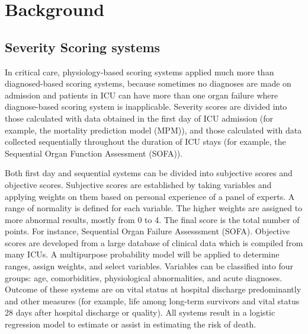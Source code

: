 \documentclass[12pt,a4paper,english
]{tunithesis}
\begin{document}
\chapter{Background}
\label{ch:background}


\section{Severity Scoring systems}
In critical care, physiology-based scoring systems applied much more than diagnosed-based scoring systems, because sometimes no diagnoses are made on admission and patients in ICU can have more than one organ failure where diagnose-based scoring system is inapplicable. \parencite{Bouch2008} Severity scores are divided into those calculated with data obtained in the first day of ICU admission (for example, the mortality prediction model (MPM)), and those calculated with data collected sequentially throughout the duration of ICU stays (for example, the Sequential Organ Function Assessment (SOFA)). 

Both first day and sequential systems can be divided into subjective scores and objective scores. Subjective scores are established by taking variables and applying weights on them based on personal experience of a panel of experts. A range of normality is defined for each variable. The higher weights are assigned to more abnormal results, mostly from 0 to 4. The final score is the total number of points. For instance, Sequential Organ Failure Assesssment (SOFA). Objective scores are developed from a large database of clinical data which is compiled from many ICUs. A multipurpose probability model will be applied to determine ranges, assign weights, and select variables. Variables can be classified into four groups: age, comorbidities, physiological abnormalities, and acute diagnoses. Outcome of these systems are on vital status at hospital discharge predominantly and other measures (for example, life among long-term survivors and vital status 28 days after hospital discharge or quality). All systems result in a logistic regression model to estimate or assist in estimating the risk of death. \parencite{LeGall2005, Bouch2008} 
\end{document}
